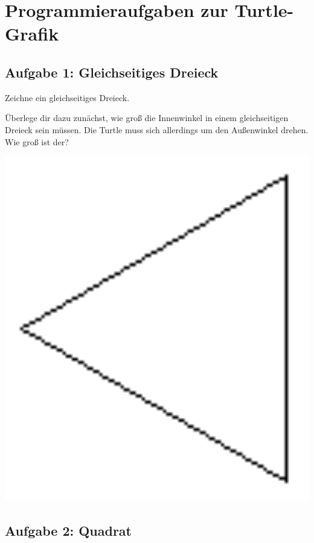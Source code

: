 \section{Programmieraufgaben zur Turtle-Grafik}

\subsection{Aufgabe 1: Gleichseitiges Dreieck}

Zeichne ein gleichseitiges Dreieck. 

\begin{minipage}{0.80\textwidth}
Überlege dir dazu zunächst, wie groß die Innenwinkel in einem gleichseitigen
Dreieck sein müssen. Die Turtle muss sich allerdings um den Außenwinkel drehen.
Wie groß ist der?
\end{minipage}\hfill
\begin{minipage}{0.1\textwidth}
\includegraphics[width=1.0\textwidth]{./inf/SEKII/05_Java_TurtleGrafik/Aufgabe1.png}
\end{minipage}

\subsection{Aufgabe 2: Quadrat}

